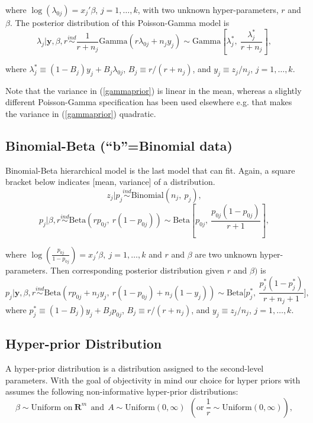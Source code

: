 \documentclass[article]{jss}
\begin{document}
where $\log(\lambda_{0j}) =x_{j}'\beta$, $j=1, \ldots, k$, with two unknown hyper-parameters, $r$ and $\beta$. The posterior distribution of this Poisson-Gamma model is
\begin{equation} \label{gammapost}
\lambda_{j}\vert \textbf{y}, \beta, r \stackrel{ind}{\sim}\frac{1}{r + n_{j}}\textrm{Gamma}(r\lambda_{0j} + n_{j}y_{j})\sim\textrm{Gamma} \left[\lambda^{\ast}_{j},~\frac{\lambda^{\ast}_{j}}{r+n_{j}} \right],
\end{equation}

where $\lambda^{\ast}_{j} \equiv (1-B_{j})y_{j} + B_{j}\lambda_{0j}$,  $B_{j}\equiv r / (r+n_{j})$, and $y_{j}\equiv z_{j} / n_{j}$, $j=1, \ldots, k$. 


Note that the variance in (\ref{gammaprior}) is linear in the mean, whereas a slightly different Poisson-Gamma specification \citep{1997} has been used elsewhere e.g. that makes the variance in (\ref{gammaprior}) quadratic.

\subsection[Binomial-Beta]{Binomial-Beta (``b''=Binomial data)}
Binomial-Beta hierarchical model is the last model that  can fit. Again, a square bracket below indicates [mean, variance] of a distribution.
\begin{equation}
z_{j} \vert p_{j}\stackrel{ind}{\sim}\textrm{Binomial}(n_{j}, ~p_{j}),
\end{equation}
\begin{equation}
p_{j} \vert \beta, r\stackrel{ind}{\sim}\textrm{Beta}(rp_{0j},~ r(1-p_{0j}))\sim \textrm{Beta} \left[p_{0j}, ~\frac{p_{0j}(1-p_{0j})}{r + 1} \right],
\end{equation}

where $\log(\frac{p_{0j}}{1-p_{0j}}) =x_{j}'\beta, ~j=1, \ldots, k$ and $r$ and $\beta$ are two unknown hyper-parameters. Then corresponding posterior distribution given  $r$ and $\beta)$ is
\begin{equation} \label{betapost}
p_{j}\vert \textbf{y}, \beta, r \stackrel{ind}{\sim}\textrm{Beta}(rp_{0j}+n_{j}y_{j},~r(1-p_{0j})+n_{j}(1-y_{j}))\sim\textrm{Beta}\bigg[p^{\ast}_{j},~ \frac{p^{\ast}_{j}(1-p^{\ast}_{j})}{r+n_{j}+1}\bigg],
\end{equation}
where $p^{\ast}_{j}\equiv(1-B_{j})y_{j}+B_{j}p_{0j}$, $B_{j}\equiv r/ (r+n_{j})$, and $y_{j}\equiv z_{j} / n_{j}$, $j=1,\ldots,k$.


\subsection[Hyper-prior Distribution]{Hyper-prior Distribution}
A hyper-prior distribution is a distribution assigned to the second-level parameters. With the goal of objectivity in mind our choice for hyper priors with  assumes the following non-informative hyper-prior distributions:
\begin{equation}
\beta \sim \textrm{Uniform on}~ \mathbf{R}^{m}~~\textrm{and}~~A \sim \textrm{Uniform}(0, \infty) ~~(\textrm{or} ~\frac{1}{r}\sim \textrm{Uniform}(0, \infty)),
\end{equation}
\end{document}
